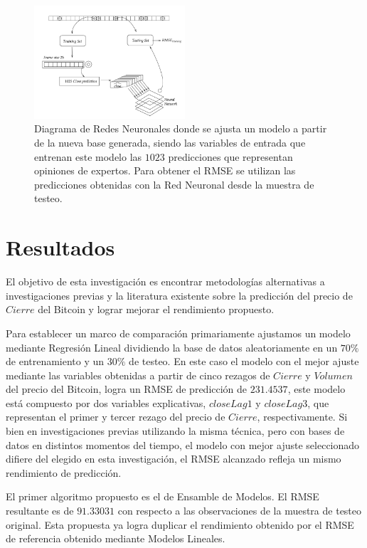 \documentclass[a4paper,12pt,twocolumn]{article}
\begin{document}
\begin{figure}[!hbt]
\centering
\includegraphics[width=0.5\textwidth]{diagramNeuralNetwork}
\caption{Diagrama de Redes Neuronales donde se ajusta un modelo a partir de la nueva base generada, siendo las variables de entrada que entrenan este modelo las $1023$ predicciones que representan opiniones de expertos. Para obtener el RMSE se utilizan las predicciones obtenidas con la Red Neuronal desde la muestra de testeo.}
\label{diagramNeuralNetwork}
\end{figure}


\section{Resultados}

El objetivo de esta investigación es encontrar metodologías alternativas a investigaciones previas y la literatura existente sobre la predicción del precio de $Cierre$ del Bitcoin y lograr mejorar el rendimiento propuesto. 

Para establecer un marco de comparación primariamente ajustamos un modelo mediante Regresión Lineal dividiendo la base de datos aleatoriamente en un $70\%$ de entrenamiento y un $30\%$ de testeo. En este caso el modelo con el mejor ajuste mediante las variables obtenidas a partir de cinco rezagos de $Cierre$ y $Volumen$ del precio del Bitcoin, logra un RMSE de predicción de  $231.4537$, este modelo está compuesto por dos variables explicativas, $closeLag1$ y $closeLag3$, que representan el primer y tercer rezago del precio de $Cierre$, respectivamente. Si bien en investigaciones previas utilizando la misma técnica, pero con bases de datos en distintos momentos del tiempo, el modelo con mejor ajuste seleccionado difiere del elegido en esta investigación, el RMSE alcanzado refleja un mismo rendimiento de predicción.

El primer algoritmo propuesto es el de Ensamble de Modelos. El RMSE resultante es de $91.33031$ con respecto a las observaciones de la muestra de testeo original. Esta propuesta ya logra duplicar el rendimiento obtenido por el RMSE de referencia obtenido mediante Modelos Lineales. 
\end{document}
